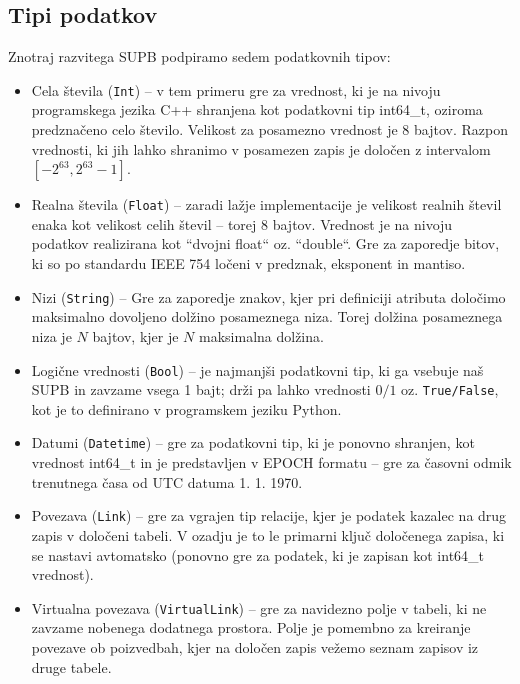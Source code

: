 \documentclass[a4paper,12pt,openright]{book}
\begin{document}
        \subsection{Tipi podatkov}
        Znotraj razvitega SUPB podpiramo sedem podatkovnih tipov:
        \begin{itemize}
            \item Cela števila ({\tt Int}) – v tem primeru gre za vrednost, ki je na nivoju programskega jezika C++ shranjena kot podatkovni tip int64\_t, oziroma predznačeno celo število. Velikost za posamezno vrednost je 8 bajtov. Razpon vrednosti, ki jih lahko shranimo v posamezen zapis je določen z intervalom $[-2^{63}, 2^{63} - 1]$.
            \item Realna števila ({\tt Float}) – zaradi lažje implementacije je velikost realnih števil enaka kot velikost celih števil – torej 8 bajtov. Vrednost je na nivoju podatkov realizirana kot ``dvojni float`` oz. ``double``. Gre za zaporedje bitov, ki so po standardu IEEE 754 \cite{kahan1996ieee} ločeni v predznak, eksponent in mantiso.
            \item Nizi ({\tt String}) – Gre za zaporedje znakov, kjer pri definiciji atributa določimo maksimalno dovoljeno dolžino posameznega niza. Torej dolžina posameznega niza je $N$ bajtov, kjer je $N$ maksimalna dolžina.
            \item Logične vrednosti ({\tt Bool}) – je najmanjši podatkovni tip, ki ga vsebuje naš SUPB in zavzame vsega 1 bajt; drži pa lahko vrednosti $0/1$ oz. {\tt True/False}, kot je to definirano v programskem jeziku Python.
            \item Datumi ({\tt Datetime}) – gre za podatkovni tip, ki je ponovno shranjen, kot vrednost int64\_t in je predstavljen v EPOCH formatu \cite{EPOCH_FORMAT} – gre za časovni odmik trenutnega časa od UTC datuma 1. 1. 1970. 
            \item Povezava ({\tt Link}) – gre za vgrajen tip relacije, kjer je podatek kazalec na drug zapis v določeni tabeli. V ozadju je to le primarni ključ določenega zapisa, ki se nastavi avtomatsko (ponovno gre za podatek, ki je zapisan kot int64\_t vrednost).
            \item Virtualna povezava ({\tt VirtualLink}) – gre za navidezno polje v tabeli, ki ne zavzame nobenega dodatnega prostora. Polje je pomembno za kreiranje povezave ob poizvedbah, kjer na določen zapis vežemo seznam zapisov iz druge tabele.  
        \end{itemize}
        
\end{document}
